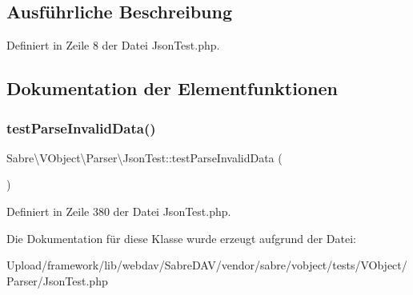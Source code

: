 \subsection{Ausführliche Beschreibung}


Definiert in Zeile 8 der Datei Json\+Test.\+php.



\subsection{Dokumentation der Elementfunktionen}
\mbox{\label{class_sabre_1_1_v_object_1_1_parser_1_1_json_test_a07ef8a1e1dfaa6109de4407a6d124c7e}} 
\subsubsection{\texorpdfstring{test\+Parse\+Invalid\+Data()}{testParseInvalidData()}}
{\footnotesize\ttfamily Sabre\textbackslash{}\+V\+Object\textbackslash{}\+Parser\textbackslash{}\+Json\+Test\+::test\+Parse\+Invalid\+Data (\begin{DoxyParamCaption}{ }\end{DoxyParamCaption})}



Definiert in Zeile 380 der Datei Json\+Test.\+php.



Die Dokumentation für diese Klasse wurde erzeugt aufgrund der Datei\+:\begin{DoxyCompactItemize}
\item 
Upload/framework/lib/webdav/\+Sabre\+D\+A\+V/vendor/sabre/vobject/tests/\+V\+Object/\+Parser/Json\+Test.\+php\end{DoxyCompactItemize}
